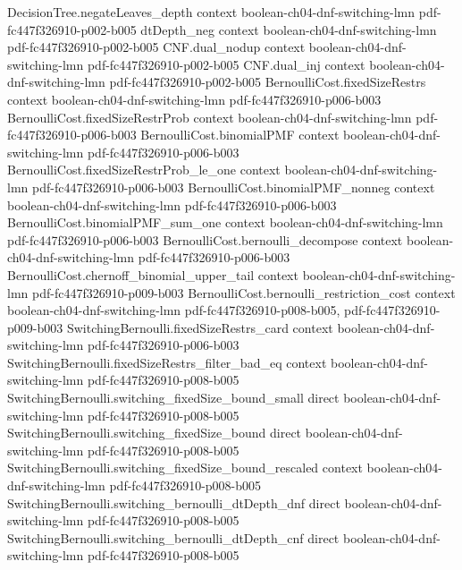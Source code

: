\begin{lemma}
\proofstep
  {DecisionTree.negateLeaves_depth}
  {context}
  {boolean-ch04-dnf-switching-lmn}
  {pdf-fc447f326910-p002-b005}
\proofstep
  {dtDepth_neg}
  {context}
  {boolean-ch04-dnf-switching-lmn}
  {pdf-fc447f326910-p002-b005}
\proofstep
  {CNF.dual_nodup}
  {context}
  {boolean-ch04-dnf-switching-lmn}
  {pdf-fc447f326910-p002-b005}
\proofstep
  {CNF.dual_inj}
  {context}
  {boolean-ch04-dnf-switching-lmn}
  {pdf-fc447f326910-p002-b005}
\proofstep
  {BernoulliCost.fixedSizeRestrs}
  {context}
  {boolean-ch04-dnf-switching-lmn}
  {pdf-fc447f326910-p006-b003}
\proofstep
  {BernoulliCost.fixedSizeRestrProb}
  {context}
  {boolean-ch04-dnf-switching-lmn}
  {pdf-fc447f326910-p006-b003}
\proofstep
  {BernoulliCost.binomialPMF}
  {context}
  {boolean-ch04-dnf-switching-lmn}
  {pdf-fc447f326910-p006-b003}
\proofstep
  {BernoulliCost.fixedSizeRestrProb_le_one}
  {context}
  {boolean-ch04-dnf-switching-lmn}
  {pdf-fc447f326910-p006-b003}
\proofstep
  {BernoulliCost.binomialPMF_nonneg}
  {context}
  {boolean-ch04-dnf-switching-lmn}
  {pdf-fc447f326910-p006-b003}
\proofstep
  {BernoulliCost.binomialPMF_sum_one}
  {context}
  {boolean-ch04-dnf-switching-lmn}
  {pdf-fc447f326910-p006-b003}
\proofstep
  {BernoulliCost.bernoulli_decompose}
  {context}
  {boolean-ch04-dnf-switching-lmn}
  {pdf-fc447f326910-p006-b003}
\proofstep
  {BernoulliCost.chernoff_binomial_upper_tail}
  {context}
  {boolean-ch04-dnf-switching-lmn}
  {pdf-fc447f326910-p009-b003}
\proofstep
  {BernoulliCost.bernoulli_restriction_cost}
  {context}
  {boolean-ch04-dnf-switching-lmn}
  {pdf-fc447f326910-p008-b005,
    pdf-fc447f326910-p009-b003}
\proofstep
  {SwitchingBernoulli.fixedSizeRestrs_card}
  {context}
  {boolean-ch04-dnf-switching-lmn}
  {pdf-fc447f326910-p006-b003}
\proofstep
  {SwitchingBernoulli.fixedSizeRestrs_filter_bad_eq}
  {context}
  {boolean-ch04-dnf-switching-lmn}
  {pdf-fc447f326910-p008-b005}
\proofstep
  {SwitchingBernoulli.switching_fixedSize_bound_small}
  {direct}
  {boolean-ch04-dnf-switching-lmn}
  {pdf-fc447f326910-p008-b005}
\proofstep
  {SwitchingBernoulli.switching_fixedSize_bound}
  {direct}
  {boolean-ch04-dnf-switching-lmn}
  {pdf-fc447f326910-p008-b005}
\proofstep
  {SwitchingBernoulli.switching_fixedSize_bound_rescaled}
  {context}
  {boolean-ch04-dnf-switching-lmn}
  {pdf-fc447f326910-p008-b005}
\proofstep
  {SwitchingBernoulli.switching_bernoulli_dtDepth_dnf}
  {direct}
  {boolean-ch04-dnf-switching-lmn}
  {pdf-fc447f326910-p008-b005}
\proofstep
  {SwitchingBernoulli.switching_bernoulli_dtDepth_cnf}
  {direct}
  {boolean-ch04-dnf-switching-lmn}
  {pdf-fc447f326910-p008-b005}

\end{lemma}
